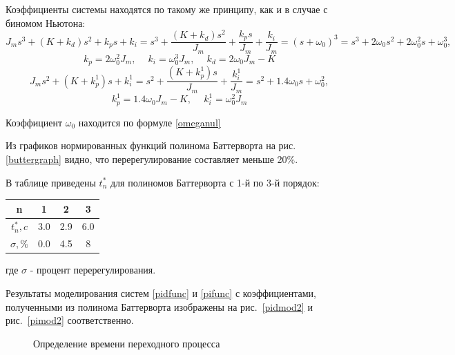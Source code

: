 Коэффициенты системы находятся по такому же принципу, как и в случае с биномом Ньютона:
\begin{equation}
	J_ms^3+(K+k_d)s^2+k_ps+k_i = s^3+\frac{(K+k_d)s^2}{J_m}+\frac{k_ps}{J_m} +\frac{k_i}{J_m} =(s+\omega_0)^3= s^3+2\omega_0s^2+2\omega_0^2s+\omega_0^3,
\end{equation}
\begin{equation}
	k_p = 2\omega_0^2J_m, \phantom{- }k_i = \omega_0^3J_m, \phantom{- } k_d=2\omega_0J_m - K
\end{equation}
\begin{equation}
	J_ms^2+(K+k_p^1)s+k_i^1 = s^2+\frac{(K+k_p^1)s}{J_m}+\frac{k_i^1}{J_m} = s^2+1.4\omega_0s+\omega_0^2,
\end{equation}
\begin{equation}
	k_p^1 =1.4\omega_0J_m-K, \phantom{- }k_i^1 = \omega_0^2J_m
\end{equation}

Коэффициент $\omega_0$ находится по формуле \eqref{omeganul}

Из графиков нормированных функций полинома Баттерворта на рис. \ref{buttergraph} видно, что перерегулирование составляет меньше 20\%.

В таблице приведены $t_n^*$ для полиномов Баттерворта с 1-й по 3-й порядок:
\begin{center}
\begin{tabular}{ |c|c|c|c| } 
 \hline
 n &  1 & 2 & 3  \\ 
 \hline
 $t_n^*, c$ &  3.0 & 2.9 & 6.0  \\ 
 \hline
 $\sigma, \%$ &  0.0 & 4.5 & 8  \\ 
 \hline
\end{tabular}
\end{center}
где $\sigma$ - процент перерегулирования. 

Результаты моделирования систем \eqref{pidfunc} и \eqref{pifunc} с коэффициентами, полученными из полинома Баттерворта изображены на рис.~\ref{pidmod2} и рис.~\ref{pimod2} соответственно.

\begin{figure}[h]
	\noindent{}
	\caption{Определение времени переходного процесса }
	\label{buttertime}
\end{figure}


